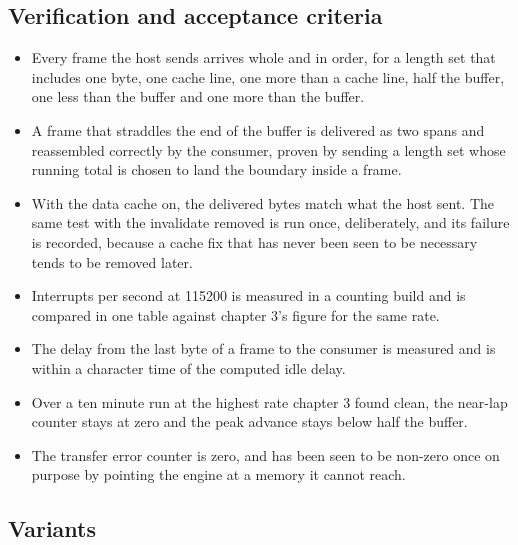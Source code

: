 \subsection*{Verification and acceptance criteria}

\begin{itemize}
\item Every frame the host sends arrives whole and in order, for a length set
that includes one byte, one cache line, one more than a cache line, half the
buffer, one less than the buffer and one more than the buffer.
\item A frame that straddles the end of the buffer is delivered as two spans and
reassembled correctly by the consumer, proven by sending a length set whose
running total is chosen to land the boundary inside a frame.
\item With the data cache on, the delivered bytes match what the host sent. The
same test with the invalidate removed is run once, deliberately, and its failure
is recorded, because a cache fix that has never been seen to be necessary tends
to be removed later.
\item Interrupts per second at 115200 is measured in a counting build and is
compared in one table against chapter 3's figure for the same rate.
\item The delay from the last byte of a frame to the consumer is measured and is
within a character time of the computed idle delay.
\item Over a ten minute run at the highest rate chapter 3 found clean, the
near-lap counter stays at zero and the peak advance stays below half the buffer.
\item The transfer error counter is zero, and has been seen to be non-zero once
on purpose by pointing the engine at a memory it cannot reach.
\end{itemize}

\subsection*{Variants}

